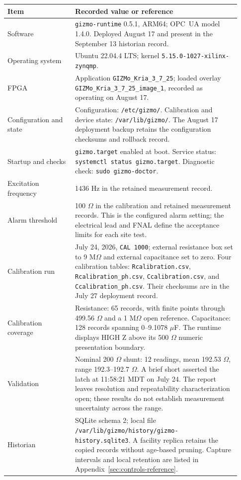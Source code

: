 \documentclass[11pt]{article}
\begin{document}
\begin{longtable}{@{}L{0.27\linewidth}L{0.66\linewidth}@{}}
\toprule
Item & Recorded value or reference \\
\midrule
\endhead
Software & \texttt{gizmo-runtime} 0.5.1, ARM64; OPC~UA model 1.4.0. Deployed August 17 and present in the September 13 historian record. \\
Operating system & Ubuntu 22.04.4 LTS; kernel \nolinkurl{5.15.0-1027-xilinx-zynqmp}. \\
FPGA & Application \nolinkurl{GIZMo_Kria_3_7_25}; loaded overlay \nolinkurl{GIZMo_Kria_3_7_25_image_1}, recorded as operating on August 17. \\
Configuration and state & Configuration: \nolinkurl{/etc/gizmo/}. Calibration and device state: \nolinkurl{/var/lib/gizmo/}. The August 17 deployment backup retains the configuration checksums and rollback record. \\
Startup and checks & \texttt{gizmo.target} enabled at boot. Service status: \texttt{systemctl status gizmo.target}. Diagnostic check: \texttt{sudo gizmo-doctor}. \\
Excitation frequency & 1436 Hz in the retained measurement record. \\
Alarm threshold & 100 $\Omega$ in the calibration and retained measurement records. This is the configured alarm setting; the electrical lead and FNAL define the acceptance limits for each site test. \\
Calibration run & July 24, 2026, \texttt{CAL 1000}; external resistance box set to 9 M$\Omega$ and external capacitance set to zero. Four calibration tables: \nolinkurl{Rcalibration.csv}, \nolinkurl{Rcalibration_ph.csv}, \nolinkurl{Ccalibration.csv}, and \nolinkurl{Ccalibration_ph.csv}. Their checksums are in the July 27 deployment record. \\
Calibration coverage & Resistance: 65 records, with finite points through 499.56 $\Omega$ and a 1 M$\Omega$ open reference. Capacitance: 128 records spanning 0--9.1078 $\mu$F. The runtime displays HIGH Z above its 500 $\Omega$ numeric presentation boundary. \\
Validation & Nominal 200 $\Omega$ shunt: 12 readings, mean 192.53 $\Omega$, range 192.3--192.7 $\Omega$. A brief short asserted the latch at 11:58:21 MDT on July 24. The report leaves resolution and repeatability characterization open; these results do not establish measurement uncertainty across the range. \\
Historian & SQLite schema 2; local file \nolinkurl{/var/lib/gizmo/history/gizmo-history.sqlite3}. A facility replica retains the copied records without age-based pruning. Capture intervals and local retention are listed in Appendix~\ref{sec:controls-reference}. \\
\bottomrule
\end{longtable}
\end{document}
